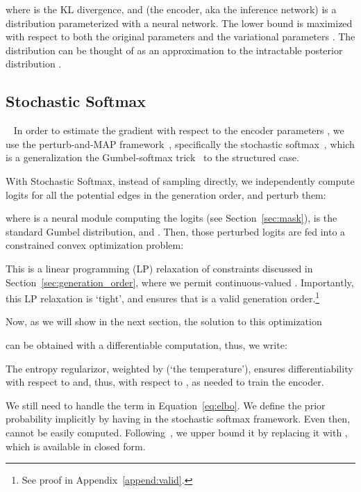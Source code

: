 \documentclass[11pt]{article}
\begin{document}
where  is the  KL divergence, and   (the encoder, aka the inference network) is a distribution parameterized with a neural network. The lower bound is maximized with respect to both the original parameters  and the variational parameters . The distribution  can be thought of as an approximation to the intractable posterior distribution
.


\subsection{Stochastic Softmax}~\label{sec:soft}
In order to estimate the gradient
with respect to the encoder parameters ,
we use the perturb-and-MAP framework~\cite{Papandreou2011PerturbandMAPRF,hazan2012partition},
specifically the stochastic softmax~\cite{Paulus2020GradientEW}, which is
 a generalization the Gumbel-softmax trick~\cite{Jang2016CategoricalRW,Maddison2017TheCD} to the structured case.


With Stochastic Softmax, instead of sampling  directly, we independently compute logits  for  all the potential edges in the generation order, and perturb them:
  
where  is a neural module computing the logits (see Section~\ref{sec:mask}),  is the standard Gumbel distribution, and . Then, those perturbed logits  are fed into a constrained convex optimization problem:

This is a linear programming (LP) relaxation of constraints  discussed in Section~\ref{sec:generation_order}, where we permit continuous-valued  . Importantly, this LP relaxation is `tight', and ensures that
  is a valid generation order.\footnote{See proof in Appendix~\ref{append:valid}.
 } 


Now, as we will show in the next section,
the solution to this optimization 

can be obtained with a differentiable computation,
thus, we write:
  
The entropy regularizor, weighted by  (`the temperature'), ensures differentiability  with respect to  and, thus, with respect to , as needed to train the encoder. 



We still need to handle the  term in Equation~\ref{eq:elbo}. We define the prior probability  implicitly by having  in the stochastic softmax framework. Even then,  cannot be easily computed. Following~, we upper bound it by replacing it with , which is available in closed form. 
\end{document}
